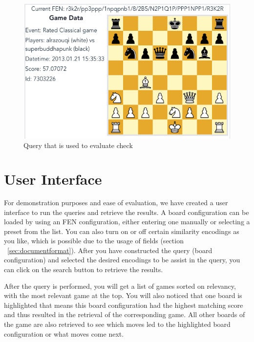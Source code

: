 \documentclass[11pt]{article}
\begin{document}
    \begin{figure}[H]
        \centering
        \includegraphics[width=12cm]{images/BlackCheck2-BoReAtDeCh}
        \caption{Query that is used to evaluate check}
        \label{fig:BlackCheck2-BoReAtDeCh}
    \end{figure}




    \section{User Interface}

    For demonstration purposes and ease of evaluation, we have created a user interface to run the queries and retrieve the results. A board configuration can be loaded by using an FEN configuration, either entering one manually or selecting a preset from the list. You can also turn on or off certain similarity encodings as you like, which is possible due to the usage of fields (section ~\ref{sec:documentformat}). After you have constructed the query (board configuration) and selected the desired encodings to be assist in the query, you can click on the search button to retrieve the results.

    After the query is performed, you will get a list of games sorted on relevancy, with the most relevant game at the top. You will also noticed that one board is highlighted that means this board configuration had the highest matching score and thus resulted in the retrieval of the corresponding game. All other boards of the game are also retrieved to see which moves led to the highlighted board configuration or what moves come next.
\end{document}
